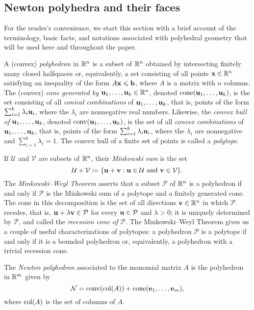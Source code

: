 \documentclass[11pt]{amsart}
\begin{document}
\subsection{Newton polyhedra and their faces}

For the reader's convenience, we start this section with a brief account of the terminology, basic facts, and notations associated with polyhedral geometry that will be used here and throughout the paper.

A (convex) \emph{polyhedron} in $\mathbb{R}^n$ is a subset of $\mathbb{R}^n$ obtained by intersecting finitely many closed halfspaces or, equivalently, a set consisting of all points $\mathbf{x}\in \mathbb{R}^n$ satisfying an inequality of the form $A\mathbf{x}\leqslant \mathbf{b}$, where $A$ is a matrix with $n$ columns.
The (convex) \emph{cone generated by $\mathbf{u}_1,\ldots,\mathbf{u}_k \in \mathbb{R}^n$}, denoted $\operatorname{cone}(\mathbf{u}_1,\ldots,\mathbf{u}_k)$, is the set consisting of all \emph{conical combinations} of $\mathbf{u}_1, \ldots, \mathbf{u}_k$, that is, points of the form $\sum_{i=1}^k \lambda_i \mathbf{u}_i$, where the $\lambda_i$ are nonnegative real numbers.
Likewise, the \emph{convex hull of $\mathbf{u}_1,\ldots,\mathbf{u}_k$}, denoted $\operatorname{conv}(\mathbf{u}_1,\ldots,\mathbf{u}_k)$, is the set of all \emph{convex combinations} of $\mathbf{u}_1, \ldots, \mathbf{u}_k$, that is, points of the form $\sum_{i=1}^k \lambda_i \mathbf{u}_i$, where the $\lambda_i$ are nonnegative and $\sum_{i=1}^k \lambda_i = 1$.
The convex hull of a finite set of points is called a \emph{polytope}.

If $\mathcal{U}$ and $\mathcal{V}$ are subsets of $\mathbb{R}^n$, their \emph{Minkowski sum} is the set
\[\mathcal{U}+\mathcal{V} \coloneqq \{\mathbf{u}+\mathbf{v}: \mathbf{u}\in \mathcal{U}\text{ and }\mathbf{v}\in \mathcal{V}\}.\]
The \emph{Minkowski--Weyl Theorem} asserts that a subset $\mathcal{P}$ of $\mathbb{R}^n$ is a polyhedron if and only if $\mathcal{P}$ is the Minkowski sum of a polytope and a finitely generated cone.
The cone in this decomposition is the set of all directions $\mathbf{v} \in \mathbb{R}^n$ in which $\mathcal{P}$ recedes, that is, $\mathbf{u} + \lambda \mathbf{v} \in \mathcal{P}$ for every $\mathbf{u} \in \mathcal{P}$ and $\lambda > 0$; it is uniquely determined by $\mathcal{P}$, and called the \emph{recession cone of $\mathcal{P}$}.
The Minkowski--Weyl Theorem gives us a couple of useful characterizations of polytopes: a polyhedron $\mathcal{P}$ is a polytope if and only if it is a bounded polyhedron or, equivalently, a polyhedron with a trivial recession cone.

\begin{definition}
The \emph{Newton polyhedron} associated to the monomial matrix $A$ is the polyhedron in $\mathbb{R}^m$ given by
\[ \mathcal{N} = \operatorname{conv}( \operatorname{col}(A) ) + \operatorname{cone}( \mathbf{e}_1, \ldots, \mathbf{e}_m), \]
where $\operatorname{col}(A)$ is the set of columns of $A$.
\end{definition}
\end{document}
